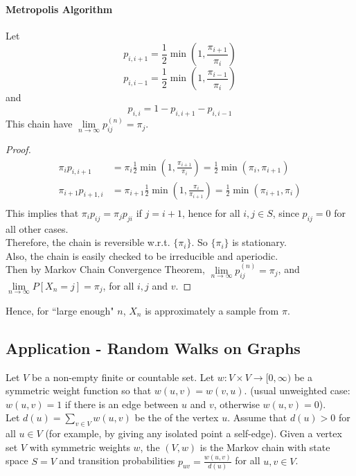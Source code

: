 \documentclass[11pt]{article}
\newcommand{\dur}[3]{{#1}_{#2}^{({#3})}}
\renewcommand{\limit}[1]{\underset{{#1} \rightarrow \infty}{\lim}}
\begin{document}
    \paragraph{Metropolis Algorithm}
    Let 
    $$p_{i,i+1} = \frac{1}{2}\min(1, \frac{\pi_{i+1}}{\pi_i})$$
    $$p_{i,i-1} = \frac{1}{2}\min(1, \frac{\pi_{i-1}}{\pi_i})$$
    and
    $$p_{i,i} = 1 - p_{i, i+1} - p_{i, i-1}$$ 
    \fact This chain have $\limit{n}\dur{p}{ij}{n} = \pi_j$.
    \begin{proof}
    	\begin{align*}
    		\pi_i p_{i, i+1} &= \pi_i \frac{1}{2}\min(1, \frac{\pi_{i+1}}{\pi_i}) = \frac{1}{2}\min(\pi_i, \pi_{i+1})\\
    		\pi_{i+1} p_{i+1, i} &= \pi_{i+1} \frac{1}{2}\min(1, \frac{\pi_i}{\pi_{i+1}}) = \frac{1}{2}\min(\pi_{i+1}, \pi_i)\\
    	\end{align*}
    	This implies that $\pi_i p_{ij} = \pi_j p_{ji}$ if $j = i+1$, hence for all $i, j \in S$, since $p_{ij} = 0$ for all other cases.\\
    	Therefore, the chain is reversible w.r.t. $\{\pi_i\}$. So $\{\pi_i\}$ is stationary.\\
    	Also, the chain is easily checked to be irreducible and aperiodic.\\
    	Then by Markov Chain Convergence Theorem, $\limit{n} \dur{p}{ij}{n} = \pi_j$, and $\limit{n} P[X_n = j] = \pi_j$, for all $i, j$ and $v$.
    \end{proof}
    \noindent Hence, for ``large enough" $n$, $X_n$ is approximately a sample from $\pi$.
	
    
    \subsection{Application - Random Walks on Graphs}
    Let $V$ be a non-empty finite or countable set. Let $w: V \times V \rightarrow [0, \infty)$ be a symmetric weight function so that $w(u,v) = w(v,u)$. (usual unweighted case: $w(u, v) = 1$ if there is an edge between $u$ and $v$, otherwise $w(u,v) = 0$).\\
    Let $d(u) = \sum_{v \in V} w(u,v)$ be the  of the vertex $u$. Assume that $d(u) > 0$ for all $u \in V$ (for example, by giving any isolated point a self-edge).
    Given a vertex set $V$ with symmetric weights $w$, the  $(V, w)$ is the Markov chain with state space $S = V$ and transition probabilities $p_{uv} = \frac{w(u,v)}{d(u)}$ for all $u, v \in V$.
    
\end{document}
